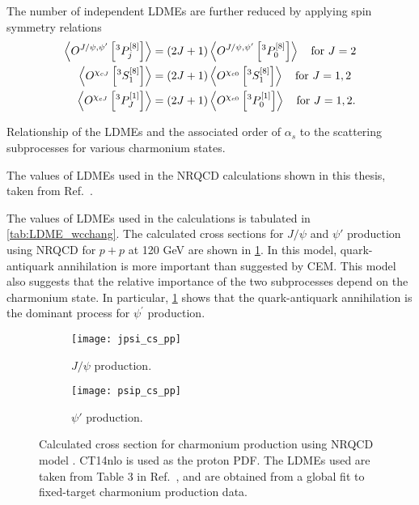 \documentclass[../main.tex]{subfiles}
\begin{document}
The number of independent LDMEs are further reduced by applying spin symmetry relations
\begin{equation}
	\begin{split}
		\expval{O^{J/\psi,\psi'}\left[^3P_j^{\left[8\right]}\right]} & = \left(2J+1\right)\expval{O^{J/\psi,\psi'}\left[^3P_0^{\left[8\right]}\right]} \quad \text{for }J=2 \\
		\expval{O^{\chi_{cJ}}\left[^3S_1^{\left[8\right]}\right]}    & = \left(2J+1\right)\expval{O^{\chi_{c0}}\left[^3S_1^{\left[8\right]}\right]} \quad \text{for }J=1,2  \\
		\expval{O^{\chi_{cJ}}\left[^3P_J^{\left[1\right]}\right]}    & = \left(2J+1\right)\expval{O^{\chi_{c0}}\left[^3P_0^{\left[1\right]}\right]} \quad \text{for }J=1,2.
	\end{split}
\end{equation}
\begin{table}[h!]
	\centering
	\caption{Relationship of the LDMEs and the associated order of $\alpha_s$ to
		the scattering subprocesses for various charmonium states.}
	\label{tab:LDME_order}
	
\end{table}
\begin{table}[h!]
	\centering
	\caption{The values of LDMEs used in the NRQCD calculations shown in this thesis,
		taken from Ref.~\cite{chang2023}.}
	\label{tab:LDME_wcchang}
	
\end{table}

The values of LDMEs used in the calculations is tabulated in \cref{tab:LDME_wcchang}.
The calculated cross sections for $J/\psi$ and $\psi'$ production using NRQCD for
$p+p$ at 120 GeV are shown in \cref{fig:NRQCD_cs}. In this model, quark-antiquark
annihilation is more important than suggested by CEM. This model also suggests
that the relative importance of the two subprocesses depend on the charmonium state.
In particular, \cref{fig:NRQCD_cs} shows that the quark-antiquark annihilation
is the dominant process for $\psi^\prime$ production.
\begin{figure}[h!]
	\centering
	\begin{subfigure}{0.45\linewidth}
		\texttt{[image: jpsi\_cs\_pp]}
		\caption{$J/\psi$ production.}
	\end{subfigure}
	\quad
	\begin{subfigure}{0.45\linewidth}
		\texttt{[image: psip\_cs\_pp]}
		\caption{$\psi'$ production.}
	\end{subfigure}
	\caption{Calculated cross section for charmonium production using NRQCD model
		\cite{chang2023a}. CT14nlo is used as the proton PDF. The LDMEs used are
		taken from Table \num{3} in Ref.~\cite{chang2023}, and are obtained from a
		global fit to fixed-target charmonium production data. }
	\label{fig:NRQCD_cs}
\end{figure}



\ifSubfilesClassLoaded{ \printbibliography[heading=bibintoc,title={References}]}{}
\end{document}
